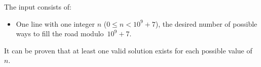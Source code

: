 
	The input consists of:
	\begin{itemize}
		\item One line with one integer $n$ ($0\leq n<10^9+7$), the desired number of possible ways to fill the road modulo~$10^9+7$.
	\end{itemize}
	It can be proven that at least one valid solution exists for each possible value of~$n$.
